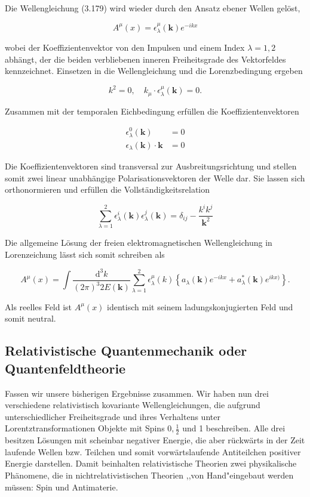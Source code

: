 \documentclass[10pt, letterpaper]{article}
\begin{document}
Die Wellengleichung (3.179) wird wieder durch den Ansatz ebener Wellen gelöst,

$$
A^{\mu}(x)=\epsilon_{\lambda}^{\mu}(\mathbf{k}) e^{-i k x}
$$

wobei der Koeffizientenvektor von den Impulsen und einem Index $\lambda=1,2$ abhängt, der die beiden verbliebenen inneren Freiheitsgrade des Vektorfeldes kennzeichnet. Einsetzen in die Wellengleichung und die Lorenzbedingung ergeben

$$
k^{2}=0, \quad k_{\mu} \cdot \epsilon_{\lambda}^{\mu}(\mathbf{k})=0 .
$$

Zusammen mit der temporalen Eichbedingung erfüllen die Koeffizientenvektoren

$$
\begin{aligned}
\epsilon_{\lambda}^{0}(\mathbf{k}) & =0 \\
\epsilon_{\lambda}(\mathbf{k}) \cdot \mathbf{k} & =0
\end{aligned}
$$

Die Koeffizientenvektoren sind transversal zur Ausbreitungsrichtung und stellen somit zwei linear unabhängige Polarisationsvektoren der Welle dar. Sie lassen sich orthonormieren und erfüllen die Vollständigkeitsrelation

$$
\sum_{\lambda=1}^{2} \epsilon_{\lambda}^{i}(\mathbf{k}) \epsilon_{\lambda}^{j}(\mathbf{k})=\delta_{i j}-\frac{k^{i} k^{j}}{\mathbf{k}^{2}}
$$

Die allgemeine Lösung der freien elektromagnetischen Wellengleichung in Lorenzeichung lässt sich somit schreiben als

$$
A^{\mu}(x)=\int \frac{\mathrm{d}^{3} k}{(2 \pi)^{3} 2 E(\mathbf{k})} \sum_{\lambda=1}^{2} \epsilon_{\lambda}^{\mu}(k)\left\{a_{\lambda}(\mathbf{k}) e^{-i k x}+a_{\lambda}^{*}(\mathbf{k}) e^{i k x)}\right\} .
$$

Als reelles Feld ist $A^{\mu}(x)$ identisch mit seinem ladungskonjugierten Feld und somit neutral.


\pagebreak

\subsection{Relativistische Quantenmechanik oder Quantenfeldtheorie}
Fassen wir unsere bisherigen Ergebnisse zusammen. Wir haben nun drei verschiedene relativistisch kovariante Wellengleichungen, die aufgrund unterschiedlicher Freiheitsgrade und ihres Verhaltens unter Lorentztransformationen Objekte mit Spins $0, \frac{1}{2}$ und 1 beschreiben. Alle drei besitzen Lösungen mit scheinbar negativer Energie, die aber rückwärts in der Zeit laufende Wellen bzw. Teilchen und somit vorwärtslaufende Antiteilchen positiver Energie darstellen. Damit beinhalten relativistische Theorien zwei physikalische Phänomene, die in nichtrelativistischen Theorien ,,von Hand"eingebaut werden müssen: Spin und Antimaterie.
\end{document}
